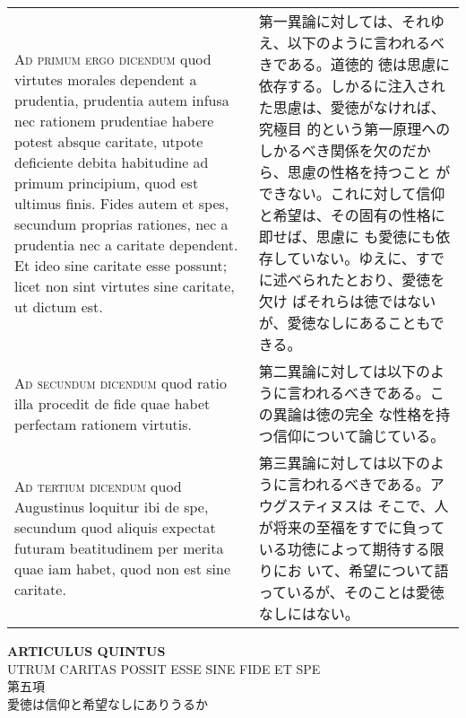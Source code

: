 \documentclass[10pt]{jsarticle}
\begin{document}
\begin{longtable}{p{21em}p{21em}}
{\scshape Ad primum ergo dicendum} quod virtutes morales dependent a
prudentia, prudentia autem infusa nec rationem prudentiae habere
potest absque caritate, utpote deficiente debita habitudine ad primum
principium, quod est ultimus finis. Fides autem et spes, secundum
proprias rationes, nec a prudentia nec a caritate dependent. Et ideo
sine caritate esse possunt; licet non sint virtutes sine caritate, ut
dictum est.


&

 第一異論に対しては、それゆえ、以下のように言われるべきである。道徳的
 徳は思慮に依存する。しかるに注入された思慮は、愛徳がなければ、究極目
 的という第一原理へのしかるべき関係を欠のだから、思慮の性格を持つこと
 ができない。これに対して信仰と希望は、その固有の性格に即せば、思慮に
 も愛徳にも依存していない。ゆえに、すでに述べられたとおり、愛徳を欠け
 ばそれらは徳ではないが、愛徳なしにあることもできる。

\\



{\scshape Ad secundum dicendum} quod ratio illa procedit de fide quae
habet perfectam rationem virtutis.


&

 第二異論に対しては以下のように言われるべきである。この異論は徳の完全
 な性格を持つ信仰について論じている。

\\


{\scshape Ad tertium dicendum} quod Augustinus loquitur ibi de spe,
secundum quod aliquis expectat futuram beatitudinem per merita quae
iam habet, quod non est sine caritate.


&

 第三異論に対しては以下のように言われるべきである。アウグスティヌスは
 そこで、人が将来の至福をすでに負っている功徳によって期待する限りにお
 いて、希望について語っているが、そのことは愛徳なしにはない。

\\


\end{longtable}
\newpage



\begin{center}
{\Large {\bf ARTICULUS QUINTUS}}\\
{\large UTRUM CARITAS POSSIT ESSE SINE FIDE ET SPE}\\
{\Large 第五項\\愛徳は信仰と希望なしにありうるか}
\end{center}
\end{document}
